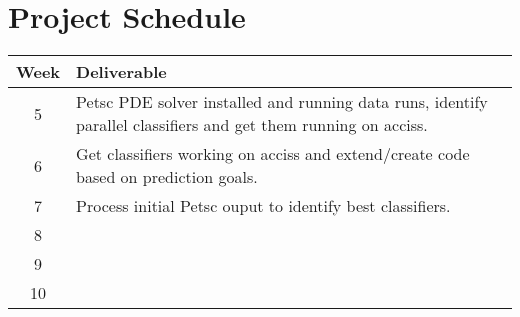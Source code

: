 \section{Project Schedule}

\begin{tabular}{c | l}
Week & Deliverable\\
\hline
5 & Petsc PDE solver installed and running data runs, identify parallel classifiers and get them running on acciss. \\ 
6 & Get classifiers working on acciss and extend/create code based on prediction goals. \\ 
7 & Process initial Petsc ouput to identify best classifiers. \\ 
8 & \\
9 & \\
10 & \\
\end{tabular}